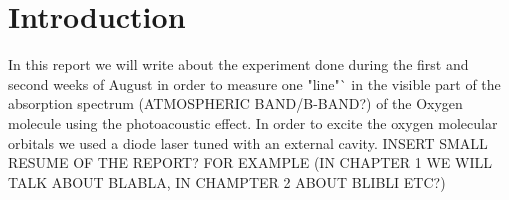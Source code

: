 \chapter*{Introduction}

In this report we will write about the experiment done during the first and second weeks of August in order to measure one "line"` in the visible part of the absorption spectrum (ATMOSPHERIC BAND/B-BAND?) of the Oxygen molecule using the photoacoustic effect. In order to excite the oxygen molecular orbitals we used a diode laser tuned with an external cavity. INSERT SMALL RESUME OF THE REPORT? FOR EXAMPLE (IN CHAPTER 1 WE WILL TALK ABOUT BLABLA, IN CHAMPTER 2 ABOUT BLIBLI ETC?)